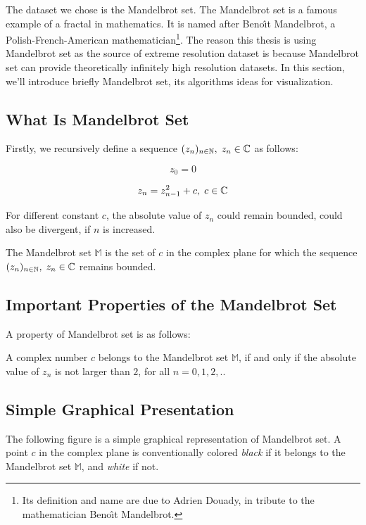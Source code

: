 The dataset we chose is the Mandelbrot set. The Mandelbrot set is a famous example of a fractal in mathematics. It is named after Beno\^{\i}t Mandelbrot, a Polish-French-American mathematician\footnote{ Its definition and name are due to Adrien Douady, in tribute to the mathematician Beno\^{\i}t Mandelbrot\cite{wiki:mandel}.}. The reason this thesis is using Mandelbrot set as the source of extreme resolution dataset is because Mandelbrot set can provide theoretically infinitely high resolution datasets. In this section, we'll introduce briefly Mandelbrot set, its algorithms ideas for visualization.

\subsection*{What Is Mandelbrot Set}

Firstly, we recursively define a sequence $\displaystyle (z_{n})_{n\in\mathbb{N}},\thickspace z_{n}\in\mathbb{C}$ as follows:

\begin{equation}
    z_0 = 0
\end{equation}

\begin{equation}
    z_{n} = z_{n-1}^2 + c,\thickspace c\in\mathbb{C}
\end{equation}

For different constant $c$, the absolute value of $z_n$ could remain bounded, could also be divergent, if $n$ is increased.

The Mandelbrot set $\mathbb{M}$ is the set of $c$ in the complex plane for which the sequence $\displaystyle (z_{n})_{n\in\mathbb{N}},\thickspace z_{n}\in\mathbb{C}$ remains bounded.

\subsection*{Important Properties of the Mandelbrot Set}

A property of Mandelbrot set is as follows:

A complex number $c$ belongs to the Mandelbrot set $\mathbb{M}$, if and only if the absolute value of $z_n$ is not larger than $2$, for all $n = 0, 1, 2, ..$

\subsection*{Simple Graphical Presentation}

The following figure  is a simple graphical representation of Mandelbrot set. A point $c$ in the complex plane is conventionally colored \emph{black} if it belongs to the Mandelbrot set $\mathbb{M}$, and \emph{white} if not. 

